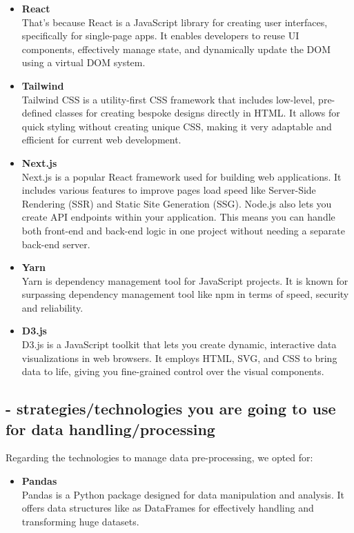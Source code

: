 \documentclass{article}
\begin{document}
\begin{itemize}

    \item \textbf{React} \\
    That's because React is a JavaScript library for creating user interfaces, specifically for single-page apps. 
    It enables developers to reuse UI components, effectively manage state, and dynamically update the DOM using a virtual DOM system.

    \item \textbf{Tailwind} \\
    Tailwind CSS is a utility-first CSS framework that includes low-level, pre-defined classes for creating bespoke designs directly in HTML. 
    It allows for quick styling without creating unique CSS, making it very adaptable and efficient for current web development.

    \item \textbf{Next.js} \\
    Next.js is a popular React framework used for building web applications.
    It includes various features to improve pages load speed like Server-Side Rendering (SSR) and Static Site Generation (SSG).
    Node.js also lets you create API endpoints within your application. This means you can handle both front-end and back-end
    logic in one project without needing a separate back-end server.

    \item \textbf{Yarn} \\
    Yarn is dependency management tool for JavaScript projects.
    It is known for surpassing dependency management tool like npm in terms of speed, security and reliability.

    \item \textbf{D3.js} \\
    D3.js is a JavaScript toolkit that lets you create dynamic, interactive data visualizations in web browsers. 
    It employs HTML, SVG, and CSS to bring data to life, giving you fine-grained control over the visual components.

\end{itemize}


\subsection{- strategies/technologies you are going to use for data handling/processing}
Regarding the technologies to manage data pre-processing, we opted for:

\begin{itemize}

    \item \textbf{Pandas} \\
    Pandas is a Python package designed for data manipulation and analysis. 
    It offers data structures like as DataFrames for effectively handling and transforming huge datasets.

\end{itemize}
\end{document}
